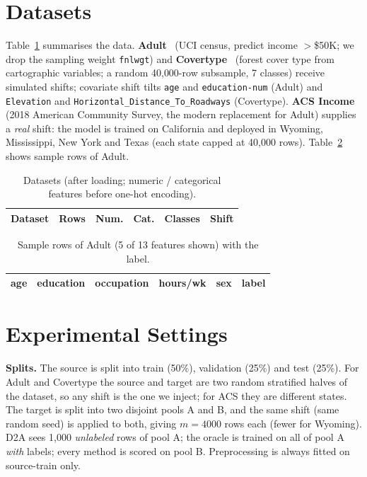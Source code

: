 \documentclass[conference]{IEEEtran}
\newcommand{\Dtwo}{\textsc{D2A}}
\begin{document}
\section{Datasets}
Table~\ref{tab:datasets} summarises the data. \textbf{Adult}~\cite{kohavi1996adult} (UCI census, predict income $>$\$50K; we drop the sampling weight \texttt{fnlwgt}) and \textbf{Covertype}~\cite{blackard1999covertype} (forest cover type from cartographic variables; a random 40{,}000-row subsample, 7 classes) receive simulated shifts; covariate shift tilts \texttt{age} and \texttt{education-num} (Adult) and \texttt{Elevation} and \texttt{Horizontal\_Distance\_To\_Roadways} (Covertype). \textbf{ACS Income}~\cite{ding2021folktables} (2018 American Community Survey, the modern replacement for Adult) supplies a \emph{real} shift: the model is trained on California and deployed in Wyoming, Mississippi, New York and Texas (each state capped at 40{,}000 rows). Table~\ref{tab:sample} shows sample rows of Adult.

\begin{table}[t]
\centering
\caption{Datasets (after loading; numeric / categorical features before one-hot encoding).}
\label{tab:datasets}
\setlength{\tabcolsep}{4pt}
\begin{tabular}{lrrrrl}
\toprule
Dataset & Rows & Num. & Cat. & Classes & Shift \\
\midrule

\bottomrule
\end{tabular}
\end{table}

\begin{table}[t]
\centering
\caption{Sample rows of Adult (5 of 13 features shown) with the label.}
\label{tab:sample}
\setlength{\tabcolsep}{3pt}
\begin{tabular}{rllrll}
\toprule
age & education & occupation & hours/wk & sex & label \\
\midrule

\bottomrule
\end{tabular}
\end{table}

\section{Experimental Settings}
\textbf{Splits.} The source is split into train (50\%), validation (25\%) and test (25\%). For Adult and Covertype the source and target are two random stratified halves of the dataset, so any shift is the one we inject; for ACS they are different states. The target is split into two disjoint pools A and B, and the same shift (same random seed) is applied to both, giving $m=4000$ rows each (fewer for Wyoming). \Dtwo{} sees 1{,}000 \emph{unlabeled} rows of pool A; the oracle is trained on all of pool A \emph{with} labels; every method is scored on pool B. Preprocessing is always fitted on source-train only.
\end{document}
